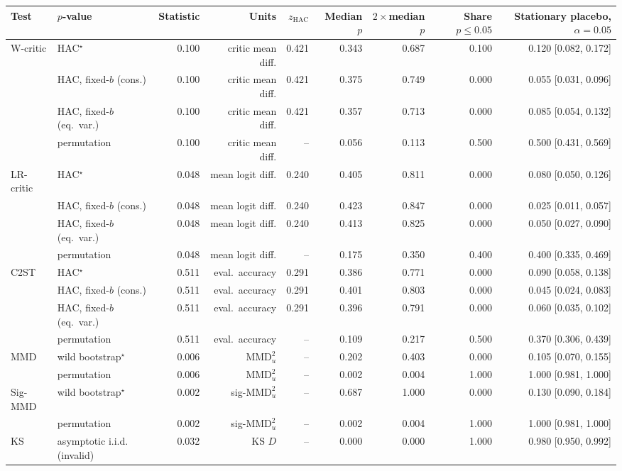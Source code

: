 \begin{tabular}{llrrrrrrr}
\toprule
Test & $p$-value & Statistic & Units & $z_{\mathrm{HAC}}$ & Median $p$ & $2\times$median $p$ & Share $p\le 0.05$ & Stationary placebo, $\alpha=0.05$ \\
\midrule
W-critic & HAC$^{\star}$ & 0.100 & critic mean diff. & 0.421 & 0.343 & 0.687 & 0.100 & 0.120 [0.082, 0.172] \\
 & HAC, fixed-$b$ (cons.) & 0.100 & critic mean diff. & 0.421 & 0.375 & 0.749 & 0.000 & 0.055 [0.031, 0.096] \\
 & HAC, fixed-$b$ (eq.\ var.) & 0.100 & critic mean diff. & 0.421 & 0.357 & 0.713 & 0.000 & 0.085 [0.054, 0.132] \\
 & permutation & 0.100 & critic mean diff. & -- & 0.056 & 0.113 & 0.500 & 0.500 [0.431, 0.569] \\
LR-critic & HAC$^{\star}$ & 0.048 & mean logit diff. & 0.240 & 0.405 & 0.811 & 0.000 & 0.080 [0.050, 0.126] \\
 & HAC, fixed-$b$ (cons.) & 0.048 & mean logit diff. & 0.240 & 0.423 & 0.847 & 0.000 & 0.025 [0.011, 0.057] \\
 & HAC, fixed-$b$ (eq.\ var.) & 0.048 & mean logit diff. & 0.240 & 0.413 & 0.825 & 0.000 & 0.050 [0.027, 0.090] \\
 & permutation & 0.048 & mean logit diff. & -- & 0.175 & 0.350 & 0.400 & 0.400 [0.335, 0.469] \\
C2ST & HAC$^{\star}$ & 0.511 & eval.\ accuracy & 0.291 & 0.386 & 0.771 & 0.000 & 0.090 [0.058, 0.138] \\
 & HAC, fixed-$b$ (cons.) & 0.511 & eval.\ accuracy & 0.291 & 0.401 & 0.803 & 0.000 & 0.045 [0.024, 0.083] \\
 & HAC, fixed-$b$ (eq.\ var.) & 0.511 & eval.\ accuracy & 0.291 & 0.396 & 0.791 & 0.000 & 0.060 [0.035, 0.102] \\
 & permutation & 0.511 & eval.\ accuracy & -- & 0.109 & 0.217 & 0.500 & 0.370 [0.306, 0.439] \\
MMD & wild bootstrap$^{\star}$ & 0.006 & $\mathrm{MMD}^2_u$ & -- & 0.202 & 0.403 & 0.000 & 0.105 [0.070, 0.155] \\
 & permutation & 0.006 & $\mathrm{MMD}^2_u$ & -- & 0.002 & 0.004 & 1.000 & 1.000 [0.981, 1.000] \\
Sig-MMD & wild bootstrap$^{\star}$ & 0.002 & sig-$\mathrm{MMD}^2_u$ & -- & 0.687 & 1.000 & 0.000 & 0.130 [0.090, 0.184] \\
 & permutation & 0.002 & sig-$\mathrm{MMD}^2_u$ & -- & 0.002 & 0.004 & 1.000 & 1.000 [0.981, 1.000] \\
KS & asymptotic i.i.d. (invalid) & 0.032 & KS $D$ & -- & 0.000 & 0.000 & 1.000 & 0.980 [0.950, 0.992] \\
\bottomrule
\end{tabular}
